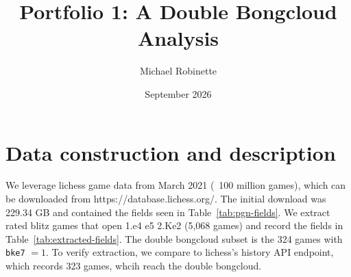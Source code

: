 \documentclass{article}
\title{Portfolio 1: A Double Bongcloud Analysis}
\author{Michael Robinette}
\date{September 2026}
\begin{document}
\maketitle

\section*{Data construction and description}
We leverage lichess game data from March 2021 (~100 million games), which can be downloaded from https://database.lichess.org/. The initial download was 229.34 GB and contained the fields seen in Table~\ref{tab:pgn-fields}. We extract rated blitz games that open 1.e4 e5 2.Ke2 (5,068 games) and record the fields in Table~\ref{tab:extracted-fields}. The double bongcloud subset is the 324 games with \texttt{bke7} $= 1$. To verify extraction, we compare to lichess's history API endpoint, which records 323 games, whcih reach the double bongcloud.
\end{document}

